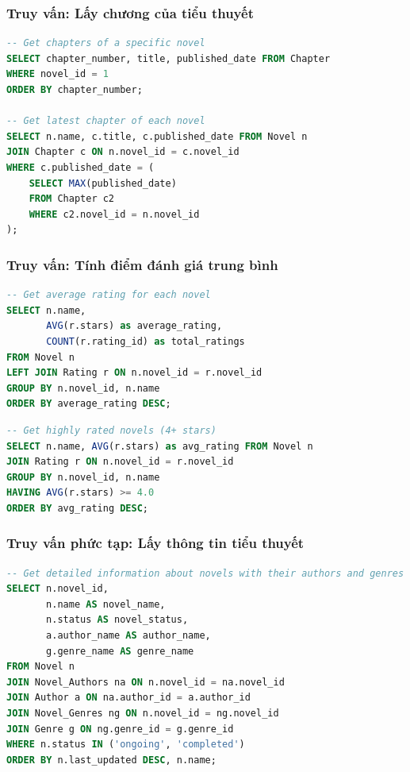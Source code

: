 \documentclass[12pt,aspectratio=169,handout]{beamer}
\begin{document}
\begin{frame}[fragile]
\frametitle{Truy vấn: Lấy chương của tiểu thuyết}
\begin{lstlisting}[language=SQL, basicstyle=\small\ttfamily]
-- Get chapters of a specific novel
SELECT chapter_number, title, published_date FROM Chapter 
WHERE novel_id = 1 
ORDER BY chapter_number;

-- Get latest chapter of each novel
SELECT n.name, c.title, c.published_date FROM Novel n
JOIN Chapter c ON n.novel_id = c.novel_id
WHERE c.published_date = (
    SELECT MAX(published_date) 
    FROM Chapter c2 
    WHERE c2.novel_id = n.novel_id
);
\end{lstlisting}
\end{frame}

\begin{frame}
\frametitle{Truy vấn: Tính điểm đánh giá trung bình}
\begin{lstlisting}[language=SQL, basicstyle=\small\ttfamily]
-- Get average rating for each novel
SELECT n.name, 
       AVG(r.stars) as average_rating, 
       COUNT(r.rating_id) as total_ratings
FROM Novel n
LEFT JOIN Rating r ON n.novel_id = r.novel_id
GROUP BY n.novel_id, n.name
ORDER BY average_rating DESC;
\end{lstlisting}

\framebreak

\begin{lstlisting}[language=SQL, basicstyle=\small\ttfamily]
-- Get highly rated novels (4+ stars)
SELECT n.name, AVG(r.stars) as avg_rating FROM Novel n
JOIN Rating r ON n.novel_id = r.novel_id
GROUP BY n.novel_id, n.name
HAVING AVG(r.stars) >= 4.0
ORDER BY avg_rating DESC;
\end{lstlisting}
\end{frame}

\begin{frame}[fragile]
\frametitle{Truy vấn phức tạp: Lấy thông tin tiểu thuyết}
\begin{lstlisting}[language=SQL, basicstyle=\tiny\ttfamily]
-- Get detailed information about novels with their authors and genres
SELECT n.novel_id, 
       n.name AS novel_name, 
       n.status AS novel_status,
       a.author_name AS author_name, 
       g.genre_name AS genre_name
FROM Novel n
JOIN Novel_Authors na ON n.novel_id = na.novel_id
JOIN Author a ON na.author_id = a.author_id
JOIN Novel_Genres ng ON n.novel_id = ng.novel_id
JOIN Genre g ON ng.genre_id = g.genre_id
WHERE n.status IN ('ongoing', 'completed')
ORDER BY n.last_updated DESC, n.name;
\end{lstlisting}
\end{frame}
\end{document}
